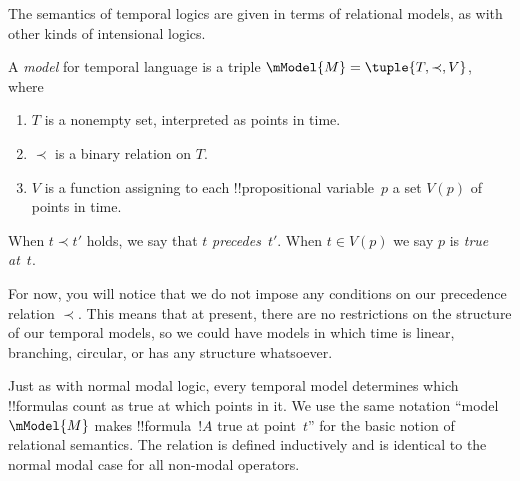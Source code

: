 \documentclass[../../../include/open-logic-section]{subfiles}
\begin{document}
The semantics of temporal logics are given in terms of relational models, as with other kinds of intensional logics. 

\begin{defn}
  A \emph{model} for temporal language is a triple
  $\mModel{M} = \tuple{T, \prec, V}$, where
  \begin{enumerate}
  \item $T$ is a nonempty set, interpreted as points in time.
  \item $\prec$ is a binary relation on $T$.
  \item $V$ is a function assigning to each !!{propositional
    variable}~$p$ a set $V(p)$ of points in time.
  \end{enumerate}
  When $t \prec t'$ holds, we say that $t$ \emph{precedes}~$t'$. 
  When $t \in V(p)$ we say $p$ is \emph{true at}~$t$.
\end{defn}

For now, you will notice that we do not impose any conditions on our precedence relation $\prec$. This means that at present, there are no restrictions on the structure of our temporal models, so we could have models in which time is linear, branching, circular, or has any structure whatsoever. 

Just as with normal modal logic, every temporal model determines which !!{formula}s count as true at
which points in it. We use the same notation ``model $\mModel{M}$ makes
!!{formula}~$!A$ true at point~$t$'' for the basic notion of relational
semantics. The relation is defined inductively and is identical to the normal modal case for all non-modal operators.
\end{document}

